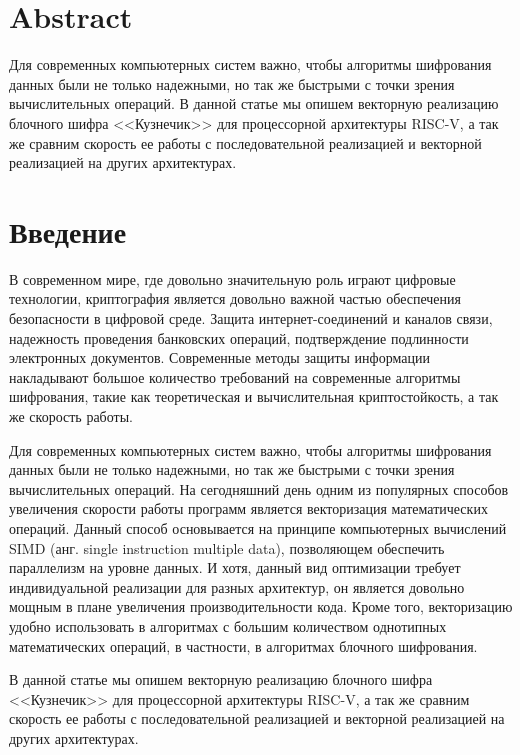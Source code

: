 \documentclass[a4paper, 12pt]{article}
\begin{document}
    

    \section{Abstract}
    Для современных компьютерных систем важно, чтобы алгоритмы шифрования данных были не
    только надежными, но так же быстрыми с точки зрения вычислительных операций. В
    данной статье мы опишем векторную реализацию блочного шифра <<Кузнечик>> для 
    процессорной архитектуры RISC-V, а так же сравним скорость ее работы с 
    последовательной реализацией и векторной реализацией на других архитектурах.

    \section{Введение}

    В современном мире, где довольно значительную роль играют цифровые технологии,
    криптография является довольно важной частью обеспечения безопасности в цифровой
    среде. Защита интернет-соединений и каналов связи, надежность проведения банковских
    операций, подтверждение подлинности электронных документов. Современные методы
    защиты информации накладывают большое количество требований на современные 
    алгоритмы шифрования, такие как теоретическая и вычислительная криптостойкость, а 
    так же скорость работы.
    
    Для современных компьютерных систем важно, чтобы алгоритмы шифрования данных были не
    только надежными, но так же быстрыми с точки зрения вычислительных операций. На 
    сегодняшний день одним из популярных способов увеличения скорости работы программ
    является векторизация математических операций. Данный способ основывается на 
    принципе компьютерных вычислений SIMD (анг. single instruction multiple data), 
    позволяющем обеспечить параллелизм на уровне данных. И хотя, данный вид
    оптимизации требует индивидуальной реализации для разных архитектур, он является
    довольно мощным в плане увеличения производительности кода. Кроме того, векторизацию
    удобно использовать в алгоритмах с большим количеством однотипных математических
    операций, в частности, в алгоритмах блочного шифрования.

    В данной статье мы опишем векторную реализацию блочного шифра <<Кузнечик>> для 
    процессорной архитектуры RISC-V, а так же сравним скорость ее работы с 
    последовательной реализацией и векторной реализацией на других архитектурах.
\end{document}
